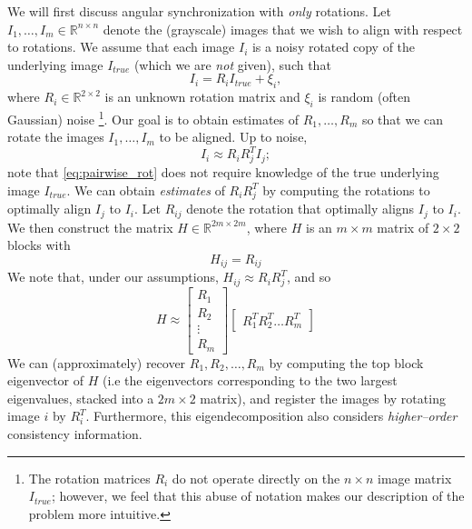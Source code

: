 \documentclass[11pt]{article}
\begin{document}
We will first discuss angular synchronization with {\em only} rotations. 
%
Let $I_1, \dots, I_m \in \mathbb{R}^{n \times n}$ denote the (grayscale) images that we wish to align with respect to rotations.
%
We assume that each image $I_i$ is a noisy rotated copy of the underlying image $I_{true}$ (which we are {\em not} given), such that 
\begin{equation}
I_i = R_i I_{true} + \xi_i,
\end{equation}
where $R_i \in \mathbb{R}^{2 \times 2}$ is an unknown rotation matrix and $\xi_i$ is random (often Gaussian) noise \footnote{The rotation matrices $R_i$ do not operate directly on the $n \times n$ image matrix $I_{true}$; however, we feel that this abuse of notation makes our description of the problem more intuitive.}. 
%
Our goal is to obtain estimates of $R_1, \dots, R_m$ so that we can rotate the images $I_1, \dots, I_m$ to be aligned.
%
Up to noise, 
\begin{equation} \label{eq:pairwise_rot}
I_i \approx R_i R_j^T I_j;
\end{equation}
 note that \eqref{eq:pairwise_rot} does not require knowledge of the true underlying image $I_{true}$.
%
We can obtain {\em estimates} of $R_i R_j^T$ by computing the rotations to optimally align $I_j$ to $I_i$. 
%
Let $R_{ij}$ denote the rotation that optimally aligns $I_j$ to $I_i$.
%
We then construct the matrix $H \in \mathbb{R}^{2m \times 2m}$, where $H$ is an $m \times m$ matrix of $2 \times 2$ blocks with
\begin{equation} \label{eq:H_to_R}
H_{ij} = R_{ij}
\end{equation}
%
We note that, under our assumptions, $H_{ij} \approx R_i R_j^T$, and so
\begin{equation} \label{eq:H_low_rank}
	H \approx 
	\begin{bmatrix}
	R_1 \\
	R_2 \\
	\vdots \\
	R_m
	\end{bmatrix}
	\begin{bmatrix}
	R_1^T R_2^T \dots R_m^T
	\end{bmatrix}
\end{equation}
%
We can (approximately) recover $R_1, R_2, \dots, R_m$ by computing the top block eigenvector of $H$ (i.e the eigenvectors corresponding to the two largest eigenvalues, stacked into a $2m \times 2$ matrix), and register the images by rotating image $i$ by $R_i^T$. 
%
Furthermore, this eigendecomposition also considers {\em higher--order} consistency information. 
\end{document}
